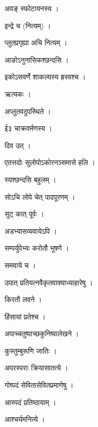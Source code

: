 \documentclass[10pt, openany]{book}
\begin{document}
\noindent अवङ् स्फोटायनस्य ।

\noindent इन्द्रे च (नित्यम्) ।

\noindent प्लुतप्रगृह्या अचि नित्यम् ।

\noindent आङोऽनुनासिकश्छन्दसि ।

\noindent इकोऽसवर्णे शाकल्यस्य ह्रस्वश्च ।

\noindent ऋत्यकः ।

\noindent अप्लुतवदुपस्थिते ।

\noindent ई३ चाक्रवर्मणस्य ।

\noindent दिव उत् ।

\noindent एतत्तदोः सुलोपोऽकोरनञ्समासे हलि ।

\noindent स्यश्छन्दसि बहुलम् ।

\noindent सोऽचि लोपे चेत् पादपूरणम् ।

\noindent सुट् कात् पूर्वः ।

\noindent अडभ्यासव्यवायेऽपि ।

\noindent सम्पर्युपेभ्यः करोतौ भूषणे ।

\noindent समवाये च ।

\noindent उपात् प्रतियत्नवैकृतवाक्याध्याहारेषु ।

\noindent किरतौ लवने ।

\noindent हिंसायां प्रतेश्च ।

\noindent अपाच्चतुष्पाच्छकुनिष्वालेखने ।

\noindent कुस्तुम्बुरूणि जातिः ।

\noindent अपरस्पराः क्रियासातत्ये ।

\noindent गोष्पदं सेवितासेवितप्रमाणेषु ।

\noindent आस्पदं प्रतिष्ठायाम् ।

\noindent आश्चर्यमनित्ये ।
\end{document}
